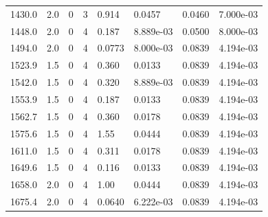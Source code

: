 \documentclass[preview]{standalone}
\begin{document}
{{{\begin{tabular}{L{1.2cm}C{1.2cm} C{0.3cm}C{0.5cm} C{1.4cm}C{1.4cm} C{1.4cm}C{1.4cm}}
  1430.0  &   2.0  & 0     &  3 &  0.914  & 0.0457  & 0.0460 &  7.000e-03   \\ 
  1448.0  &   2.0  & 0     &  4 &  0.187  & 8.889e-03  & 0.0500 &  8.000e-03   \\ 
  1494.0  &   2.0  & 0     &  4 &  0.0773  & 8.000e-03  & 0.0839 &  4.194e-03   \\ 
  1523.9  &   1.5  & 0     &  4 &  0.360  & 0.0133  & 0.0839 &  4.194e-03   \\ 
  1542.0  &   1.5  & 0     &  4 &  0.320  & 8.889e-03  & 0.0839 &  4.194e-03   \\ 
  1553.9  &   1.5  & 0     &  4 &  0.187  & 0.0133  & 0.0839 &  4.194e-03   \\ 
  1562.7  &   1.5  & 0     &  4 &  0.360  & 0.0178  & 0.0839 &  4.194e-03   \\ 
  1575.6  &   1.5  & 0     &  4 &  1.55  & 0.0444  & 0.0839 &  4.194e-03   \\ 
  1611.0  &   1.5  & 0     &  4 &  0.311  & 0.0178  & 0.0839 &  4.194e-03   \\ 
  1649.6  &   1.5  & 0     &  4 &  0.116  & 0.0133  & 0.0839 &  4.194e-03   \\ 
  1658.0  &   2.0  & 0     &  4 &  1.00  & 0.0444  & 0.0839 &  4.194e-03   \\ 
  1675.4  &   2.0  & 0     &  4 &  0.0640  & 6.222e-03  & 0.0839 &  4.194e-03   \\ 
\hline 
\end{tabular} 

}}}
\end{document}

